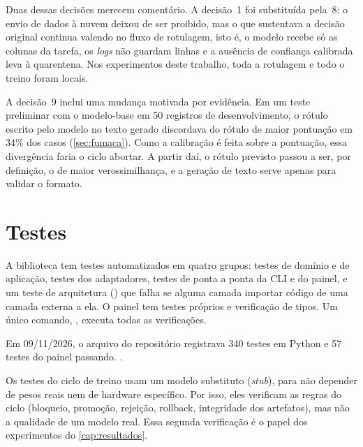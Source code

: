 Duas dessas decisões merecem comentário. A decisão~1 foi substituída pela~8: o envio de dados à nuvem deixou de ser proibido, mas o que sustentava a decisão original continua valendo no fluxo de rotulagem, isto é, o modelo recebe só as colunas da tarefa, os \emph{logs} não guardam linhas e a ausência de confiança calibrada leva à quarentena. Nos experimentos deste trabalho, toda a rotulagem e todo o treino foram locais.

A decisão~9 inclui uma mudança motivada por evidência. Em um teste preliminar com o modelo-base em 50 registros de desenvolvimento, o rótulo escrito pelo modelo no texto gerado discordava do rótulo de maior pontuação em 34\% dos casos (\autoref{sec:fumaca}). Como a calibração é feita sobre a pontuação, essa divergência faria o ciclo abortar. A partir daí, o rótulo previsto passou a ser, por definição, o de maior verossimilhança, e a geração de texto serve apenas para validar o formato.

\section{Testes}

A biblioteca tem testes automatizados em quatro grupos: testes de domínio e de aplicação, testes dos adaptadores, testes de ponta a ponta da CLI e do painel, e um teste de arquitetura () que falha se alguma camada importar código de uma camada externa a ela. O painel tem testes próprios e verificação de tipos. Um único comando, , executa todas as verificações.

Em 09/11/2026, o arquivo  do repositório registrava 340 testes em Python e 57 testes do painel passando. .

Os testes do ciclo de treino usam um modelo substituto (\emph{stub}), para não depender de pesos reais nem de hardware específico. Por isso, eles verificam as regras do ciclo (bloqueio, promoção, rejeição, rollback, integridade dos artefatos), mas não a qualidade de um modelo real. Essa segunda verificação é o papel dos experimentos do \autoref{cap:resultados}.
